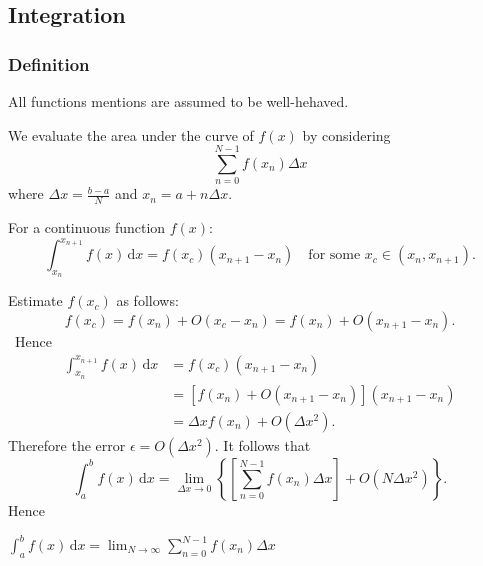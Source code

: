 \documentclass[a4paper]{article}
\begin{document}
    \subsection{Integration}
    \subsubsection{Definition}
    All functions mentions are assumed to be well-hehaved.

    We evaluate the area under the curve of $f(x)$ by considering
    \[
        \sum_{n=0}^{N-1}f(x_n)\Delta x
    \]
    where $ \Delta x = \frac{b-a}{N} $ and $ x_n = a+n\Delta x. $
    \begin{theorem}[MVT]\label{thm:mean_value_theorem_for_integral}
        For a continuous function $f(x)$:
        \[
            \int_{x_n}^{x_{n+1}} f(x) \,\mathrm{d}x = f(x_c)(x_{n+1}-x_n) \quad \text{for some } x_c\in (x_n,x_{n+1})
        .\]
    \end{theorem}
    Estimate $ f(x_c) $ as follows:
    \[
        f(x_c) = f(x_n)+O(x_c-x_n) = f(x_n)+O(x_{n+1}-x_n)
    .\]\
    Hence
    \[
        \begin{aligned}
            \int_{x_n}^{x_{n+1}} f(x) \,\mathrm{d}x &= f(x_c)(x_{n+1}-x_n)\\
            &= [f(x_n)+O(x_{n+1}-x_n)](x_{n+1}-x_n)\\
            &= \Delta x f(x_n)+O(\Delta x^2).
        \end{aligned}
    \]
    Therefore the error $ \epsilon = O(\Delta x^2) $. It follows that
    \[
        \int_{a}^{b} f(x) \,\mathrm{d}x = \lim_{\Delta x \to 0} \left\{ \left[ \sum_{n=0}^{N-1}f(x_n)\Delta x \right] + O(N\Delta x^2)\right\}
    .\]
    Hence 
    \begin{definition}
        $\displaystyle \int_{a}^{b} f(x) \,\mathrm{d}x = \lim_{N \to \infty} \sum_{n=0}^{N-1}f(x_n)\Delta x$ 
    \end{definition}
\end{document}
